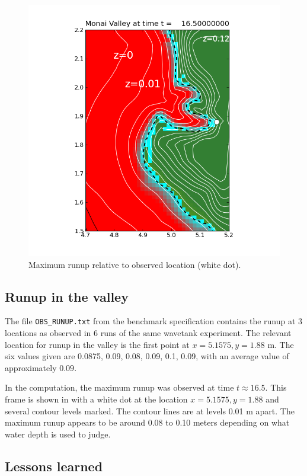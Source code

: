 \begin{figure}[ht]
\hfil\includegraphics[width=5.0in]{bp7/figs423/contours.png}\hfil
\caption{\label{fig:bp7runup} 
Maximum runup relative to observed location (white dot).
  }
\end{figure}

\subsection{Runup in the valley}
The file {\tt OBS\_RUNUP.txt} from the benchmark specification contains
the runup at 3 locations as observed in 6 runs of the same wavetank
experiment.  The relevant location for runup in the valley is the first
point at $x=5.1575, y=1.88$ m.  The six values given are 0.0875, 0.09,
0.08, 0.09, 0.1, 0.09, with an average value of approximately $0.09$.

In the computation, the maximum runup was observed at time $t\approx 16.5$.
This frame is shown in  with a white dot at the location
$x=5.1575, y=1.88$ and several contour levels marked.  The contour lines are
at levels 0.01 m apart.  The maximum runup appears to be around 0.08 to 0.10
meters depending on what water depth is used to judge.

\subsection{Lessons learned}

